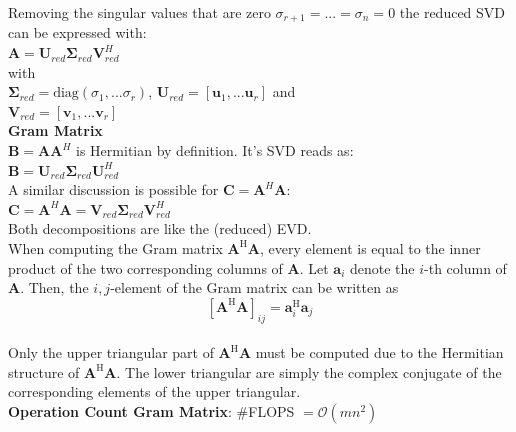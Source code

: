 \documentclass[english]{latex4ei/latex4ei_sheet}
\begin{document}
\begin{sectionbox}
Removing the singular values that are zero $\sigma_{r+1}=...=\sigma_{n}=0$ the reduced SVD can be expressed with:\\

$\mathbf{A} = \mathbf{U}_{red}\mathbf{\Sigma}_{red}\mathbf{V}^H_{red}$\\
with\\
$\mathbf{\Sigma}_{red} = \text{diag}(\sigma_1, ...\sigma_r)$, 
$\mathbf{U}_{red} = [\mathbf{u}_1, ...\mathbf{u}_r]$ and\\
$\mathbf{V}_{red} = [\mathbf{v}_1, ...\mathbf{v}_r]$\\

\textbf{Gram Matrix}\\

$\mathbf{B} = \mathbf{A}\mathbf{A}^H$ is Hermitian by definition. It's SVD reads as:\\

$\mathbf{B} = \mathbf{U}_{red}\mathbf{\Sigma}_{red}\mathbf{U}_{red}^H$\\
A similar discussion is possible for $\mathbf{C} = \mathbf{A}^H\mathbf{A}$:\\

$\mathbf{C}=\mathbf{A}^H\mathbf{A} = \mathbf{V}_{red}\mathbf{\Sigma}_{red}\mathbf{V}^H_{red}$\\

Both decompositions are like the (reduced) EVD.\\
When computing the Gram matrix $\mathbf{A}^\text{H}\mathbf{A}$, every element is equal to the inner product of the two corresponding columns of $\mathbf{A}$. Let $\mathbf{a}_i$ denote the $i$-th column of $\mathbf{A}$. Then, the $i,j$-element of the Gram matrix can be written as
$$[\mathbf{A}^\text{H}\mathbf{A}]_{ij} = \mathbf{a}_i^\text{H}\mathbf{a}_j$$\\
Only the upper triangular part of $\mathbf{A}^\text{H}\mathbf{A}$ must be computed due to the Hermitian structure of $\mathbf{A}^\text{H}\mathbf{A}$. The lower triangular are simply the complex conjugate of the corresponding elements of the upper triangular.\\
\textbf{Operation Count Gram Matrix}: \#FLOPS $=\mathcal{O}(mn^2)$
\end{sectionbox}
\end{document}
